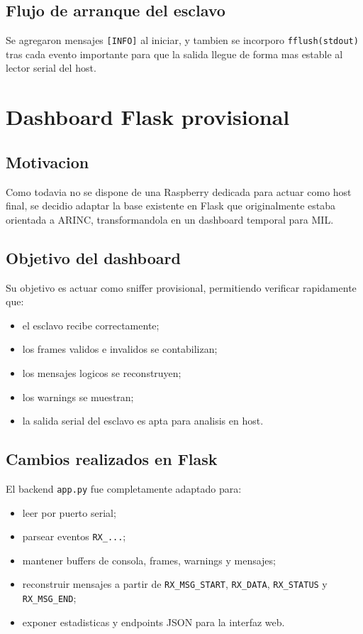 \documentclass[12pt,a4paper]{article}
\begin{document}
\subsection{Flujo de arranque del esclavo}

Se agregaron mensajes \texttt{[INFO]} al iniciar, y tambien se incorporo \texttt{fflush(stdout)}
tras cada evento importante para que la salida llegue de forma mas estable al lector serial del host.

\section{Dashboard Flask provisional}

\subsection{Motivacion}

Como todavia no se dispone de una Raspberry dedicada para actuar como host final, se decidio
adaptar la base existente en Flask que originalmente estaba orientada a ARINC, transformandola en
un dashboard temporal para MIL.

\subsection{Objetivo del dashboard}

Su objetivo es actuar como sniffer provisional, permitiendo verificar rapidamente que:

\begin{itemize}
    \item el esclavo recibe correctamente;
    \item los frames validos e invalidos se contabilizan;
    \item los mensajes logicos se reconstruyen;
    \item los warnings se muestran;
    \item la salida serial del esclavo es apta para analisis en host.
\end{itemize}

\subsection{Cambios realizados en Flask}

El backend \texttt{app.py} fue completamente adaptado para:

\begin{itemize}
    \item leer por puerto serial;
    \item parsear eventos \texttt{RX\_...};
    \item mantener buffers de consola, frames, warnings y mensajes;
    \item reconstruir mensajes a partir de \texttt{RX\_MSG\_START}, \texttt{RX\_DATA},
    \texttt{RX\_STATUS} y \texttt{RX\_MSG\_END};
    \item exponer estadisticas y endpoints JSON para la interfaz web.
\end{itemize}
\end{document}
